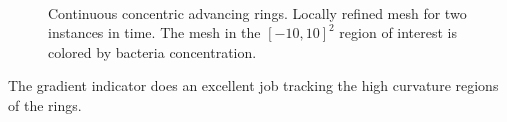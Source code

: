 \begin{figure}
  \begin{center}
     \\
    \caption[Continuous concentric advancing rings.  Locally refined mesh for two instances in time.]{Continuous concentric advancing rings.  Locally refined mesh for two instances in time.  The mesh in the $[-10,10]^2$ region of interest is colored by bacteria concentration.\label{fig:bio_concentric_rings_amr}}
  \end{center}
\end{figure}
The gradient indicator does an excellent job tracking the high curvature regions of the rings.

